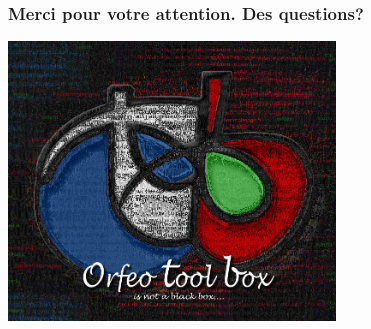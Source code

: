 \documentclass[8pt]{beamer}
\begin{document}
\begin{frame}
\frametitle{Merci pour votre attention. Des questions?}
\begin{minipage}[t][6cm][t]{\textwidth}
\begin{center}
\includegraphics[width=0.65\textwidth]{images/LOGOTB_blackbox.png}
\end{center}
\end{minipage}
\end{frame}
\end{document}
